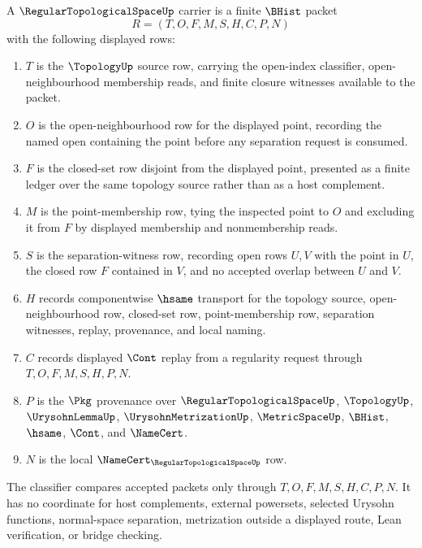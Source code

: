 \begin{definition}
\label{def:regular-topological-space-carrier}
A $\RegularTopologicalSpaceUp$ carrier is a finite $\BHist$ packet
$$
R=(T,O,F,M,S,H,C,P,N)
$$
with the following displayed rows:
\begin{enumerate}
\item $T$ is the $\TopologyUp$ source row, carrying the open-index classifier, open-neighbourhood membership reads, and finite closure witnesses available to the packet.
\item $O$ is the open-neighbourhood row for the displayed point, recording the named open containing the point before any separation request is consumed.
\item $F$ is the closed-set row disjoint from the displayed point, presented as a finite ledger over the same topology source rather than as a host complement.
\item $M$ is the point-membership row, tying the inspected point to $O$ and excluding it from $F$ by displayed membership and nonmembership reads.
\item $S$ is the separation-witness row, recording open rows $U,V$ with the point in $U$, the closed row $F$ contained in $V$, and no accepted overlap between $U$ and $V$.
\item $H$ records componentwise $\hsame$ transport for the topology source, open-neighbourhood row, closed-set row, point-membership row, separation witnesses, replay, provenance, and local naming.
\item $C$ records displayed $\Cont$ replay from a regularity request through $T,O,F,M,S,H,P,N$.
\item $P$ is the $\Pkg$ provenance over $\RegularTopologicalSpaceUp$, $\TopologyUp$, $\UrysohnLemmaUp$, $\UrysohnMetrizationUp$, $\MetricSpaceUp$, $\BHist$, $\hsame$, $\Cont$, and $\NameCert$.
\item $N$ is the local $\NameCert_{\RegularTopologicalSpaceUp}$ row.
\end{enumerate}
The classifier compares accepted packets only through $T,O,F,M,S,H,C,P,N$. It has no coordinate for host complements, external powersets, selected Urysohn functions, normal-space separation, metrization outside a displayed route, Lean verification, or bridge checking.
\end{definition}

